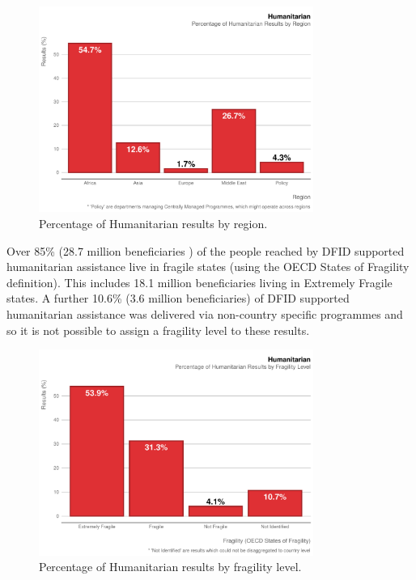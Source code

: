 \begin{figure}[htbp]
	\centering
\begin{knitrout}
\color{fgcolor}
\includegraphics[width=0.8\textwidth]{figs/human_region_plot-1} 

\end{knitrout}
	\caption{Percentage of Humanitarian results by region.}
	\label{fig:human_region_plot}
\end{figure}


Over 85\%
(28.7 million beneficiaries
) of the people reached by DFID supported humanitarian assistance live in fragile states (using the OECD States of Fragility definition). %
This includes
18.1
million beneficiaries living in Extremely Fragile states. %
A further
10.6\%
(3.6
million beneficiaries) of DFID supported humanitarian assistance was delivered via non-country specific programmes and so it is not possible to assign a fragility level to these results. %


\begin{figure}[htbp]
	\centering
\begin{knitrout}
\color{fgcolor}
\includegraphics[width=0.8\textwidth]{figs/human_fragility_plot-1} 

\end{knitrout}
	\caption{Percentage of Humanitarian results by fragility level.}
	\label{fig:human_fragility_plot}
\end{figure}


